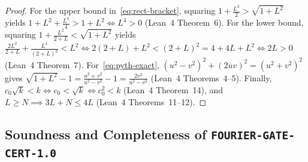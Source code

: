 \documentclass[11pt,a4paper]{article}
\theoremstyle{definition}
\theoremstyle{remark}
\newcommand{\certschema}{\texttt{FOURIER-GATE-CERT-1.0}}
\begin{document}
\begin{proof}
For the upper bound in~\eqref{eq:rect-bracket}, squaring $1 + \frac{L^2}{2} > \sqrt{1+L^2}$ yields $1 + L^2 + \frac{L^4}{4} > 1 + L^2 \iff L^4 > 0$ (Lean~4 Theorem~6). For the lower bound, squaring $1 + \frac{L^2}{2+L} < \sqrt{1+L^2}$ yields $\frac{2L^2}{2+L} + \frac{L^4}{(2+L)^2} < L^2 \iff 2(2+L) + L^2 < (2+L)^2 = 4 + 4L + L^2 \iff 2L > 0$ (Lean~4 Theorem~7). For~\eqref{eq:pyth-exact}, $(u^2-v^2)^2 + (2uv)^2 = (u^2+v^2)^2$ gives $\sqrt{1+L^2} - 1 = \frac{u^2+v^2}{u^2-v^2} - 1 = \frac{2v^2}{u^2-v^2}$ (Lean~4 Theorems~4--5). Finally, $c_0 \sqrt{k} < k \iff c_0 < \sqrt{k} \iff c_0^2 < k$ (Lean~4 Theorem~14), and $L \ge N \implies 3L + N \le 4L$ (Lean~4 Theorems~11--12).
\end{proof}

\subsection{Soundness and Completeness of \texorpdfstring{\certschema{}}{FOURIER-GATE-CERT-1.0}}
\end{document}
